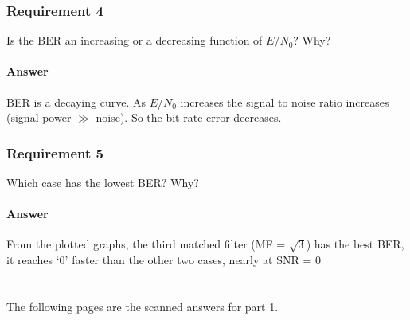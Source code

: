 \documentclass[
	12pt, %
	oneside
]{fphw}
\begin{document}
\clearpage
\section*{Requirement 4}
\begin{problem}
	Is the BER an increasing or a decreasing function of $E$/$N_0$? Why?
\end{problem}

\subsection*{Answer}
BER is a decaying curve. As $E$/$N_0$ increases the signal to noise ratio increases (signal power $\gg$ noise). So the bit rate error decreases.

\section*{Requirement 5}
\begin{problem}
	Which case has the lowest BER? Why?
\end{problem}
\subsection*{Answer}
From the plotted graphs, the third matched filter (MF = $\sqrt{3}$) has the best BER, it reaches ‘0’ faster than the other two cases, nearly at SNR = 0

\setcounter{part}{0}
\part{}
The following pages are the scanned answers for part 1.

\end{document}
